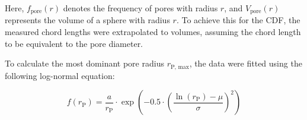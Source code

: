 Here, $f_\text{pore}(r)$ denotes the frequency of pores with radius $r$, and $V_\text{pore}(r)$ represents the volume of a sphere with radius $r$.
To achieve this for the \ac{CDF}, the measured chord lengths were extrapolated to volumes, assuming the chord length to be equivalent to the pore diameter.

To calculate the most dominant pore radius $r_\text{P, max}$, the data were fitted using the following log-normal equation:

\begin{equation}
    f(r_\text{P}) = \frac{a}{r_\text{P}} \cdot \exp\left( -0.5 \cdot \left( \frac{\ln(r_\text{P}) - \mu}{\sigma} \right)^2 \right)
    \label{eq:lognormal_fit}
\end{equation}
